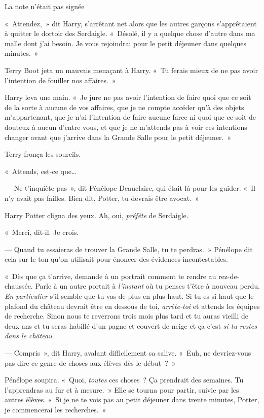 La note n'était pas signée

\later

«~Attendez,~» dit Harry, s'arrêtant net alors que les autres garçons s'apprêtaient à quitter le dortoir des Serdaigle. «~Désolé, il y a quelque chose d'autre dans ma malle dont j'ai besoin. Je vous rejoindrai pour le petit déjeuner dans quelques minutes.~»

Terry Boot jeta un mauvais menaçant à Harry. «~Tu ferais mieux de ne pas avoir l'intention de fouiller nos affaires.~»

Harry leva une main. «~Je jure ne pas avoir l'intention de faire quoi que ce soit de la sorte à aucune de vos affaires, que je ne compte accéder qu'à des objets m'appartenant, que je n'ai l'intention de faire aucune farce ni quoi que ce soit de douteux à aucun d'entre vous, et que je ne m'attends pas à voir ces intentions changer avant que j'arrive dans la Grande Salle pour le petit déjeuner.~»

Terry fronça les sourcils.

«~Attends, est-ce que…

--- Ne t'inquiète pas~», dit Pénélope Deauclaire, qui était là pour les guider. «~Il n'y avait pas failles. Bien dit, Potter, tu devrais être avocat.~»

Harry Potter cligna des yeux. Ah, oui, \emph{préfète} de Serdaigle.

«~Merci, dit-il. Je crois.

--- Quand tu essaieras de trouver la Grande Salle, tu te perdras.~» Pénélope dit cela sur le ton qu'on utilisait pour énoncer des évidences incontestables.

«~Dès que ça t'arrive, demande à un portrait comment te rendre au rez-de-chaussée. Parle à un autre portait à \emph{l'instant} où tu penses t'être à nouveau perdu. \emph{En particulier} s'il semble que tu vas de plus en plus haut. Si tu es si haut que le plafond du château devrait être en dessous de toi, \emph{arrête-toi} et attends les équipes de recherche. Sinon nous te reverrons trois mois plus tard et tu auras vieilli de deux ans et tu seras habillé d'un pagne et couvert de neige et ça c'est \emph{si tu restes dans le château}.

--- Compris~», dit Harry, avalant difficilement sa salive. «~Euh, ne devriez-vous pas dire ce genre de choses aux élèves dès le début~?~»

Pénélope soupira. «~Quoi, \emph{toutes} ces choses~? Ça prendrait des semaines. Tu l'apprendras au fur et à mesure.~» Elle se tourna pour partir, suivie par les autres élèves. «~Si je ne te vois pas au petit déjeuner dans trente minutes, Potter, je commencerai les recherches.~»

